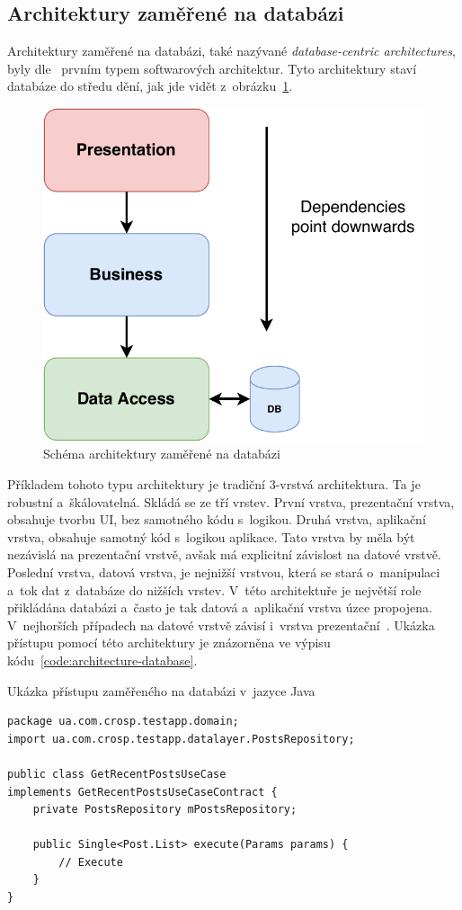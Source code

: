 \subsection{Architektury zaměřené na databázi}

Architektury zaměřené na databázi,
také nazývané \emph{database-centric architectures},
byly dle~\cite{architecture} prvním typem softwarových architektur.
Tyto architektury staví databáze do středu dění,
jak jde vidět z~obrázku~\ref{fig:architecture_database}.

\begin{figure}
    \centering
    \includegraphics[width=0.5\linewidth]{assets/technology-research/architecture/database-centric.pdf}
    \caption{Schéma architektury zaměřené na databázi~\cite{architecture}}
    \label{fig:architecture_database}
\end{figure}

Příkladem tohoto typu architektury je tradiční 3-vrstvá architektura.
Ta je robustní a~škálovatelná.
Skládá se ze tří vrstev.
První vrstva,
prezentační vrstva,
obsahuje tvorbu UI,
bez samotného kódu s~logikou.
Druhá vrstva,
aplikační vrstva,
obsahuje samotný kód s~logikou aplikace.
Tato vrstva by měla být nezávislá na prezentační vrstvě,
avšak má explicitní závislost na datové vrstvě.
Poslední vrstva,
datová vrstva,
je nejnižší vrstvou,
která se stará o~manipulaci a~tok dat z~databáze do
nižších vrstev.
V~této architektuře je největší role přikládána databázi
a~často je tak datová a~aplikační vrstva úzce propojena.
V~nejhorších případech na datové vrstvě závisí
i~vrstva prezentační~\cite{architecture}.
Ukázka přístupu pomocí této architektury je znázorněna ve výpisu
kódu~\ref{code:architecture-database}.

\begin{listing}
    \caption{Ukázka přístupu zaměřeného na databázi v~jazyce Java~\cite{architecture}}
    \label{code:architecture-database}
    \begin{verbatim}
package ua.com.crosp.testapp.domain;
import ua.com.crosp.testapp.datalayer.PostsRepository;

public class GetRecentPostsUseCase
implements GetRecentPostsUseCaseContract {
    private PostsRepository mPostsRepository;

    public Single<Post.List> execute(Params params) {
        // Execute
    }
}
    \end{verbatim}
\end{listing}



